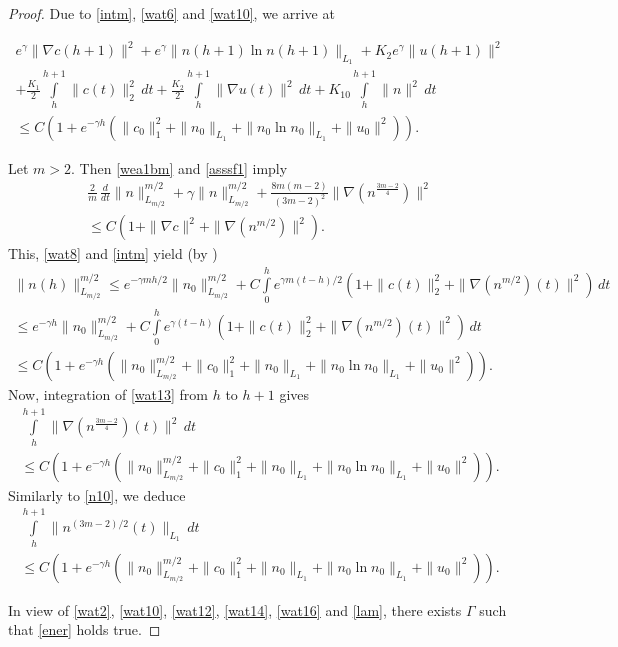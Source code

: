 \documentclass[10pt]{amsart}
\begin{document}
\begin{proof}
Due to \eqref{intm}, \eqref{wat6} and \eqref{wat10}, we arrive at

\begin{multline}\label{wat12}
e^\gamma \|\nabla c(h+1)\|^2 + e^\gamma \|n(h+1)\ln n(h+1)\|_{L_1}+  K_2 e^\gamma \|u(h+1)\|^2 \\ +\frac {K_1 } 2 \int\limits_h^{h+1}   \|c(t)\|^2_2 \, dt+ \frac {K_2 } 2 \int\limits_h^{h+1} \|\nabla u(t)\|^2\, dt + {K_{10} }  \int\limits_h^{h+1}  \|n\|^2\, dt \\ \leq C(1+e^{-\gamma h} (\|c_0\|^2_1 +\|n_0\|_{L_1} +\|n_0\ln n_0\|_{L_1}+  \|u_0\|^2)).
\end{multline}

Let $m > 2$. Then \eqref{wea1bm} and \eqref{asssf1} imply
\begin{multline}\label{wat13}
\frac 2 m \,\frac {d}{dt}\|n\|_{L_{m/2}}^{m/2}+\gamma  \|n\|_{L_{m/2}}^{m/2}+ \frac {8m(m-2)}{(3m-2)^2} \|\nabla(n^{\frac {3m-2}4})\|^2 \\ \leq C(1+\|\nabla c\|^2+\|\nabla (n^{m/2})\|^2).
\end{multline}
This, \eqref{wat8} and  \eqref{intm} yield (by \cite[p. 35]{cvb}) 
\begin{multline}\label{wat14}
\|n(h)\|_{L_{m/2}}^{m/2}\leq  e^{-\gamma m h/2} \|n_0\|_{L_{m/2}}^{m/2} + C \int\limits_0^{h}e^{\gamma m (t-h)/2}(1+\|c(t)\|_2^2+\|\nabla (n^{m/2})(t)\|^2)\,dt \\ \leq e^{-\gamma h} \|n_0\|_{L_{m/2}}^{m/2} + C \int\limits_0^{h}e^{\gamma (t-h)}(1+\|c(t)\|_2^2+\|\nabla (n^{m/2})(t)\|^2)\,dt \\ \leq C(1+e^{-\gamma h} (\|n_0\|_{L_{m/2}}^{m/2} +\|c_0\|^2_1 +\|n_0\|_{L_1}+\|n_0\ln n_0\|_{L_1}+  \|u_0\|^2)).
\end{multline}
Now, integration of \eqref{wat13} from $h$ to $h+1$ gives
\begin{multline}\label{wat15} \int\limits_h^{h+1} \|\nabla(n^{\frac {3m-2}4})(t)\|^2\, dt \\ \leq C(1+e^{-\gamma h} (\|n_0\|_{L_{m/2}}^{m/2} +\|c_0\|^2_1 +\|n_0\|_{L_1} +\|n_0\ln n_0\|_{L_1}+  \|u_0\|^2)).\end{multline}
Similarly to \eqref{n10}, we deduce
\begin{multline}\label{wat16} \int\limits_h^{h+1} \|n^{(3m-2)/2}(t)\|_{L_{1}}\, dt \\ \leq C(1+e^{-\gamma h} (\|n_0\|_{L_{m/2}}^{m/2} +\|c_0\|^2_1 +\|n_0\|_{L_1} +\|n_0\ln n_0\|_{L_1}+  \|u_0\|^2)).\end{multline}

In view of \eqref{wat2}, \eqref{wat10}, \eqref{wat12}, \eqref{wat14}, \eqref{wat16} and \eqref{lam}, there exists $\Gamma$ such that \eqref{ener} holds true. 
\end{proof}
\end{document}
